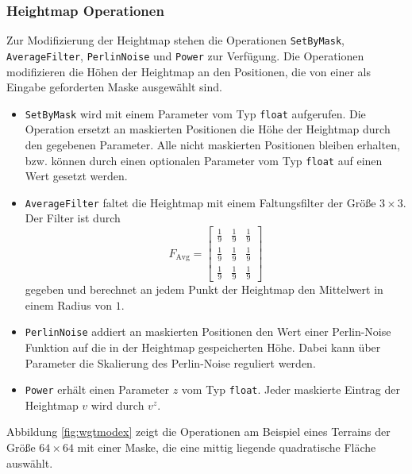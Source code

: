 \subsubsection{Heightmap Operationen}
Zur Modifizierung der Heightmap stehen die Operationen \texttt{SetByMask}, \texttt{AverageFilter}, \texttt{PerlinNoise} und \texttt{Power} zur Verfügung. Die Operationen modifizieren die Höhen der Heightmap an den Positionen, die von einer als Eingabe geforderten Maske ausgewählt sind.
\begin{itemize}
    \item \texttt{SetByMask} wird mit einem Parameter vom Typ \texttt{float} aufgerufen. Die Operation ersetzt an maskierten Positionen die Höhe der Heightmap durch den gegebenen Parameter. Alle nicht maskierten Positionen bleiben erhalten, bzw. können durch einen optionalen Parameter vom Typ \texttt{float} auf einen Wert gesetzt werden.
    \item \texttt{AverageFilter} faltet die Heightmap mit einem Faltungsfilter der Größe $3\times 3$. Der Filter ist durch \begin{displaymath}
        F_{\text{Avg}}=\begin{bmatrix}
            \frac{1}{9}&\frac{1}{9}&\frac{1}{9}\\
            \frac{1}{9}&\frac{1}{9}&\frac{1}{9}\\
            \frac{1}{9}&\frac{1}{9}&\frac{1}{9}
        \end{bmatrix}
    \end{displaymath}
    gegeben und berechnet an jedem Punkt der Heightmap den Mittelwert in einem Radius von $1$.
    \item \texttt{PerlinNoise} addiert an maskierten Positionen den Wert einer Perlin-Noise Funktion auf die in der Heightmap gespeicherten Höhe. Dabei kann über Parameter die Skalierung des Perlin-Noise reguliert werden.
    \item \texttt{Power} erhält einen Parameter $z$ vom Typ \texttt{float}. Jeder maskierte Eintrag der Heightmap $v$ wird durch $v^z$.
\end{itemize}
Abbildung \ref{fig:wgtmodex} zeigt die Operationen am Beispiel eines Terrains der Größe $64\times 64$ mit einer Maske, die eine mittig liegende quadratische Fläche auswählt.

